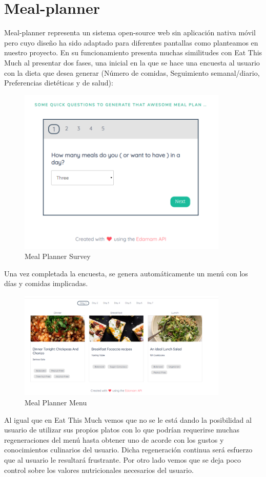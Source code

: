 \documentclass[12pt, a4paper, twoside]{book}
\begin{document}
	\section{Meal-planner}	
	Meal-planner representa un sistema open-source web sin aplicación nativa móvil pero cuyo diseño ha sido adaptado para diferentes pantallas como planteamos en nuestro proyecto.
	En su funcionamiento presenta muchas similitudes con Eat This Much al presentar dos fases, una inicial en la que se hace una encuesta al usuario con la dieta que desea generar (Número de comidas, Seguimiento semanal/diario, Preferencias dietéticas y de salud):
	\begin{center}
		\begin{figure}[H]
			\centering
			\includegraphics[width=10cm]{Imagenes/MealPlannerSurvey.png}
			\caption{Meal Planner Survey}\label{Meal Planner Survey}
		\end{figure}
	\end{center}
	Una vez completada la encuesta, se genera automáticamente un menú con los días y comidas implicadas.
	\begin{center}
		\begin{figure}[H]
			\centering
			\includegraphics[width=10cm]{Imagenes/MealPlannerMenu.png}
			\caption{Meal Planner Menu}\label{Meal Planner Menu}
		\end{figure}
	\end{center}
	Al igual que en Eat This Much vemos que no se le está dando la posibilidad al usuario de utilizar sus propios platos con lo que podrían requerirse muchas regeneraciones del menú hasta obtener uno de acorde con los gustos y conocimientos culinarios del usuario. Dicha regeneración continua será esfuerzo que al usuario le resultará frustrante. Por otro lado vemos que se deja poco control sobre los valores nutricionales necesarios del usuario.
\end{document}
